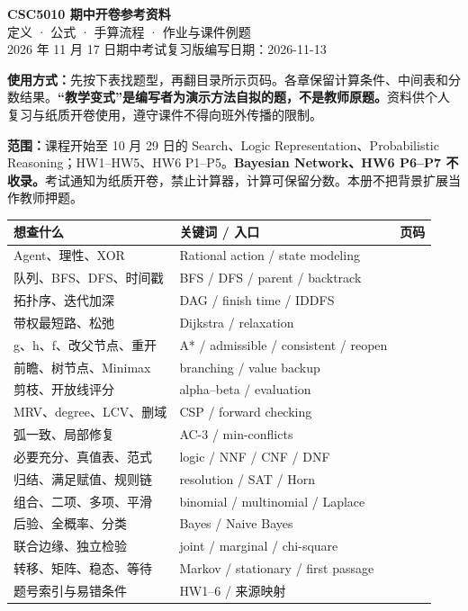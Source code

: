 \documentclass[UTF8,10pt,a4paper,fontset=fandol]{ctexart}
\begin{document}
\begin{center}
{\LARGE\bfseries CSC5010 期中开卷参考资料}\\[5pt]
{\large 定义 · 公式 · 手算流程 · 作业与课件例题}\\[4pt]
2026 年 11 月 17 日期中考试复习版\quad 编写日期：2026-11-13
\end{center}
\textbf{使用方式：}先按下表找题型，再翻目录所示页码。各章保留计算条件、中间表和分数结果。\textbf{“教学变式”是编写者为演示方法自拟的题，不是教师原题。}资料供个人复习与纸质开卷使用，遵守课件不得向班外传播的限制。

\textbf{范围：}课程开始至 10 月 29 日的 Search、Logic Representation、Probabilistic Reasoning；HW1--HW5、HW6 P1--P5。\textbf{Bayesian Network、HW6 P6--P7 不收录。}考试通知为纸质开卷，禁止计算器，计算可保留分数。本册不把背景扩展当作教师押题。

\par\noindent\begin{tabularx}{\textwidth}{p{}Y r}
\toprule 想查什么 & 关键词 / 入口 & 页码\\\midrule
Agent、理性、XOR & Rational action / state modeling & \pageref{sec:intro}\\
队列、BFS、DFS、时间戳 & BFS / DFS / parent / backtrack & \pageref{sec:search}\\
拓扑序、迭代加深 & DAG / finish time / IDDFS & \pageref{ex:topo}\\
带权最短路、松弛 & Dijkstra / relaxation & \pageref{ex:dijkstra}\\
g、h、f、改父节点、重开 & A* / admissible / consistent / reopen & \pageref{sec:astar}\\
前瞻、树节点、Minimax & branching / value backup & \pageref{sec:games}\\
剪枝、开放线评分 & alpha--beta / evaluation & \pageref{ex:ab}\\
MRV、degree、LCV、删域 & CSP / forward checking & \pageref{sec:csp}\\
弧一致、局部修复 & AC-3 / min-conflicts & \pageref{ex:ac}\\
必要充分、真值表、范式 & logic / NNF / CNF / DNF & \pageref{sec:logic}\\
归结、满足赋值、规则链 & resolution / SAT / Horn & \pageref{ex:resolution}\\
组合、二项、多项、平滑 & binomial / multinomial / Laplace & \pageref{sec:prob}\\
后验、全概率、分类 & Bayes / Naive Bayes & \pageref{sec:bayes}\\
联合边缘、独立检验 & joint / marginal / chi-square & \pageref{sec:markov}\\
转移、矩阵、稳态、等待 & Markov / stationary / first passage & \pageref{ex:transition}\\
题号索引与易错条件 & HW1--6 / 来源映射 & \pageref{sec:crossref}\\\bottomrule
\end{tabularx}\par
\end{document}
